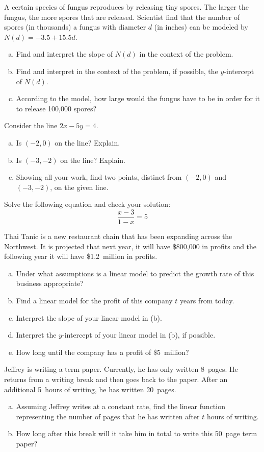 \documentclass[11pt,letterpaper]{article}
\begin{document}
	
\prob A certain species of fungus reproduces by releasing tiny spores. The larger the fungus, the more spores that are released. Scientist find that the number of spores (in thousands) a fungus with diameter $d$ (in inches) can be modeled by $N(d)= -3.5 + 15.5d$.
	\begin{enumerate}[(a)]
	\item Find and interpret the slope of $N(d)$ in the context of the problem.
	\item Find and interpret in the context of the problem, if possible, the $y$-intercept of $N(d)$.
	\item According to the model, how large would the fungus have to be in order for it to release 100,000 spores?
	\end{enumerate} \pspace	
	

\prob	 Consider the line $2x - 5y= 4$.
	\begin{enumerate}[(a)]
	\item Is $(-2, 0)$ on the line? Explain.
	\item Is $(-3, -2)$ on the line? Explain.
	\item Showing all your work, find two points, distinct from $(-2, 0)$ and $(-3, -2)$, on the given line. 
	\end{enumerate} \pspace


\prob Solve the following equation and check your solution:
	\[
	\dfrac{x - 3}{1 - x}= 5
	\] \pspace
	
	
\prob Thai Tanic is a new restaurant chain that has been expanding across the Northwest. It is projected that next year, it will have \$800,000 in profits and the following year it will have \$1.2~million in profits. 
	\begin{enumerate}[(a)]
	\item Under what assumptions is a linear model to predict the growth rate of this business appropriate?
	\item Find a linear model for the profit of this company $t$ years from today. 
	\item Interpret the slope of your linear model in (b).
	\item Interpret the $y$-intercept of your linear model in (b), if possible. 
	\item How long until the company has a profit of \$5~million? 
	\end{enumerate} \pspace		
	
	
\prob Jeffrey is writing a term paper. Currently, he has only written 8~pages. He returns from a writing break and then goes back to the paper. After an additional 5~hours of writing, he has written 20~pages. 
	\begin{enumerate}[(a)]
	\item Assuming Jeffrey writes at a constant rate, find the linear function representing the number of pages that he has written after $t$ hours of writing. 
	\item How long after this break will it take him in total to write this 50~page term paper?
	\end{enumerate} \pspace 	
\end{document}
